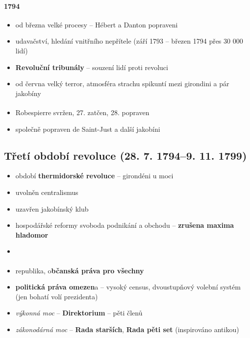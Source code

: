 \paragraph{1794}
\begin{itemize}
\item od března velké procesy -- Hébert a Danton popraveni
\item udavačství, hledání vnitřního nepřítele (září 1793 -- březen 1794 přes 30 000 lidí)
\item \textbf{Revoluční tribunály} -- souzení lidí proti revoluci
\item od června velký terror, atmosféra strachu \ra spikuntí mezi girondini a pár jakobíny
\end{itemize}
\paragraph{}
\begin{itemize}
\item Robespierre svržen, 27. zatčen, 28. popraven
\item společně popraven de Saint-Just a další jakobíni
\end{itemize}

\subsection{Třetí období revoluce (28. 7. 1794--9. 11. 1799)}
\begin{itemize}
\item období \textbf{thermidorské revoluce} -- girondéni u moci
\item uvolněn centralismus
\item uzavřen jakobínský klub
\item hospodářské reformy \ra svoboda podnikání a obchodu -- \textbf{zrušena maxima} \ra \textbf{hladomor}
\item {}
\end{itemize}

\paragraph{}
\begin{itemize}
\item republika, o\textbf{bčanská práva pro všechny}
\item \textbf{politická práva omezen}a -- vysoký census, dvoustupňový volební systém (jen bohatí volí prezidenta)
\item \textit{výkonná moc} -- \textbf{Direktorium} -- pěti členů
\item \textit{zákonodárná moc} -- \textbf{Rada starších}, \textbf{Rada pěti set} (inspirováno antikou)
\end{itemize}

